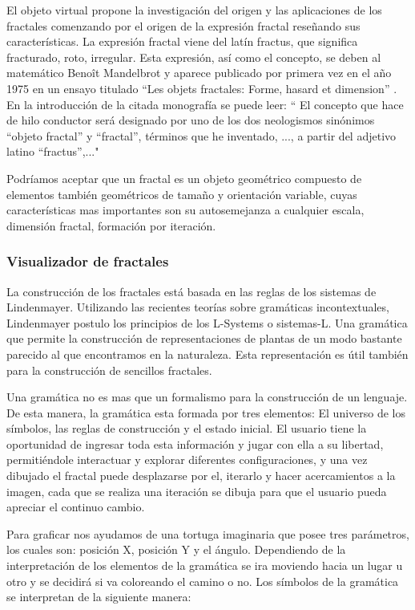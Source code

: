 \documentclass[letterpaper, 11pt, oneside]{article}
\theoremstyle{definition}
\theoremstyle{remark}
\begin{document}
El objeto virtual propone la investigación del origen y las aplicaciones de los fractales comenzando por el origen de la expresión fractal reseñando sus características. La expresión fractal viene del latín fractus, que significa fracturado, roto, irregular. Esta expresión, así como el concepto, se deben al matemático Benoît  Mandelbrot y aparece publicado por primera vez en el año 1975 en un ensayo titulado “Les objets fractales: Forme, hasard et dimension” \cite{Mandelbrot}.
En la introducción de la citada monografía se puede leer:
“ El concepto que hace de hilo conductor será designado por uno de los dos neologismos sinónimos “objeto fractal” y “fractal”, términos que he inventado, ..., a partir del adjetivo latino “fractus”,..."

Podríamos aceptar que un fractal es un objeto geométrico compuesto de elementos también geométricos de tamaño y orientación variable, cuyas características mas importantes son su autosemejanza a cualquier escala, dimensión fractal, formación por iteración.

\subsubsection{Visualizador de fractales} 

La construcción de los fractales está basada en las reglas de los sistemas de Lindenmayer. Utilizando las recientes teorías sobre gramáticas incontextuales, Lindenmayer postulo los principios de los L-Systems o sistemas-L. Una gramática que permite la construcción de representaciones de plantas de un modo bastante parecido al que encontramos en la naturaleza. Esta representación es útil también para la construcción de sencillos fractales.

Una gramática no es mas que un formalismo para la construcción de un lenguaje. De esta manera, la gramática esta formada por tres elementos: El universo de los símbolos,  las reglas de construcción y el estado inicial. El usuario tiene la oportunidad de ingresar toda esta información y jugar con ella a su libertad, permitiéndole interactuar y explorar diferentes configuraciones, y una vez dibujado el fractal puede desplazarse por el, iterarlo y hacer acercamientos a la imagen, cada que se realiza una iteración se dibuja para que el usuario pueda apreciar el continuo cambio.

Para graficar nos ayudamos de una tortuga imaginaria que posee tres parámetros, los cuales son: posición X, posición Y y el ángulo. Dependiendo de la interpretación de los elementos de la gramática se ira moviendo hacia un lugar u otro y se decidirá si va coloreando el camino o no. Los símbolos de la gramática se interpretan de la siguiente manera:
\end{document}
